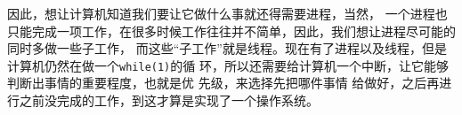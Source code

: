 因此，想让计算机知道我们要让它做什么事就还得需要进程，当然，
一个进程也
只能完成一项工作，在很多时候工作往往并不简单，因此，我们想让进程尽可能的同时多做一些子工作，
而这些“子工作”就是线程。现在有了进程以及线程，但是计算机仍然在做一个\texttt{while(1)}的循
环，所以还需要给计算机一个中断，让它能够判断出事情的重要程度，也就是优
先级，来选择先把哪件事情
给做好，之后再进行之前没完成的工作，到这才算是实现了一个操作系统\cite{yy2009}。



